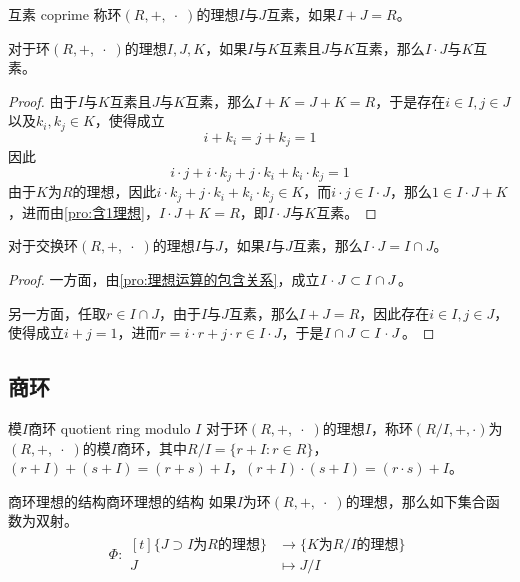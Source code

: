 \begin{definition}{互素 coprime}
	称环$(R,+,\;\cdot\;)$的理想$I$与$J$互素，如果$I+J=R$。
\end{definition}

\begin{proposition}
	对于环$(R,+,\;\cdot\;)$的理想$I,J,K$，如果$I$与$K$互素且$J$与$K$互素，那么$I\cdot J$与$K$互素。
\end{proposition}

\begin{proof}
	由于$I$与$K$互素且$J$与$K$互素，那么$I+K=J+K=R$，于是存在$i\in I,j\in J$以及$k_i,k_j\in K$，使得成立
	$$
	i+k_i=j+k_j=1
	$$
	因此
	$$
	i\cdot j+i\cdot k_j+j\cdot k_i+k_i\cdot k_j=1
	$$
	由于$K$为$R$的理想，因此$i\cdot k_j+j\cdot k_i+k_i\cdot k_j\in K$，而$i\cdot j\in I\cdot J$，那么$1\in I\cdot J+K$，进而由\ref{pro:含1理想}，$I\cdot J+K=R$，即$I\cdot J$与$K$互素。
\end{proof}

\begin{proposition}
	对于交换环$(R,+,\;\cdot\;)$的理想$I$与$J$，如果$I$与$J$互素，那么$I\cdot J=I\cap J$。
\end{proposition}

\begin{proof}
	一方面，由\ref{pro:理想运算的包含关系}，成立$I\cdot J\subset I\cap J$。
	
	另一方面，任取$r\in I\cap J$，由于$I$与$J$互素，那么$I+J=R$，因此存在$i\in I,j\in J$，使得成立$i+j=1$，进而$r=i\cdot r+j\cdot r\in I\cdot J$，于是$I\cap J\subset I\cdot J$。
\end{proof}

\subsection{商环}

\begin{definition}{模$I$商环 quotient ring modulo $I$}
	对于环$(R,+,\;\cdot\;)$的理想$I$，称环$(R/I,+,\cdot)$为$(R,+,\;\cdot\;)$的模$I$商环，其中$R/I=\{ r+I:r\in R \}$，$(r+I)+(s+I)=(r+s)+I$，$(r+I)\cdot (s+I)=(r\cdot s)+I$。
\end{definition}

\begin{proposition}{商环理想的结构}{商环理想的结构}
	如果$I$为环$(R,+,\;\cdot\;)$的理想，那么如下集合函数为双射。
	\begin{align*}
		\Phi:\begin{aligned}[t]
			\{ J\supset I\text{为}R\text{的理想} \}&\longrightarrow \{ K\text{为}R/I\text{的理想} \}\\
			J&\longmapsto J/I
		\end{aligned}
	\end{align*}
\end{proposition}

